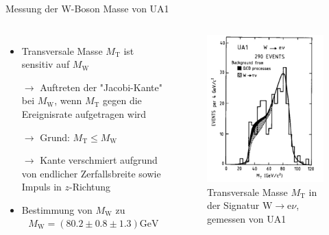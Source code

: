 \documentclass[aspectratio=1610, professionalfonts, 10pt]{beamer}
\begin{document}
\begin{frame}{Messung der W-Boson Masse von UA1}
	\begin{columns}
				\begin{itemize}
					\setlength\itemsep{0.5em}
					\vspace*{-20px}
					\item Transversale Masse $M_\text{T}$ ist sensitiv auf $M_\text{W}$
					\item[$\rightarrow$] Auftreten der "Jacobi-Kante" bei $M_\text{W}$, wenn $M_\text{T}$ gegen die Ereignisrate aufgetragen wird
					\item[$\rightarrow$] Grund: $M_\text{T} \leq M_\text{W}$
					\item[$\rightarrow$] Kante verschmiert aufgrund von endlicher Zerfallsbreite sowie Impuls in $z$-Richtung
					\item Bestimmung von $M_\text{W}$ zu \cite{doi:10.1142/9789814644150_0006}
					\begin{align*}
						M_\text{W} = \left( \num{80.2} \pm \num{0.8} \pm \num{1.3} \right)\si{\giga\electronvolt}
					\end{align*}
				\end{itemize}
			\begin{figure}
	  			\centering
				\includegraphics[width=0.65\linewidth]{Images/Screenshot_2018-12-05_16-22-51.png}
				\caption{Transversale Masse $M_\text{T}$ in der Signatur $\text{W} \rightarrow \text{e} \nu$, gemessen von UA1 \cite{doi:10.1142/9789814644150_0006}}
	  			\label{fig:sad}
			\end{figure}
	\end{columns}
\end{frame}


\end{document}
